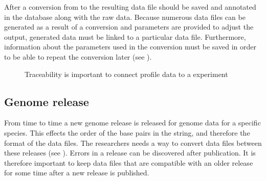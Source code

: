 After a conversion from  to  the resulting  data file should be saved and annotated in the database along with the raw data. Because numerous  data files can be generated as a result of a conversion and parameters are provided to adjust the output, generated  data must be linked to a particular  data file. Furthermore, information about the parameters used in the conversion must be saved in order to be able to repeat the conversion later (see ).

\begin{figure}[h]
\caption{Traceability is important to connect profile data to a experiment}
\label{fig:target_trace}
\end{figure}



\subsection{Genome release}
From time to time a new genome release is released for genome data for a specific species. This effects the order of the base pairs in the  string, and therefore the format of the  data files. The researchers needs a way to convert  data files between these releases (see ). Errors in a release can be discovered after publication. It is therefore important to keep data files that are compatible with an older release for some time after a new release is published.  

